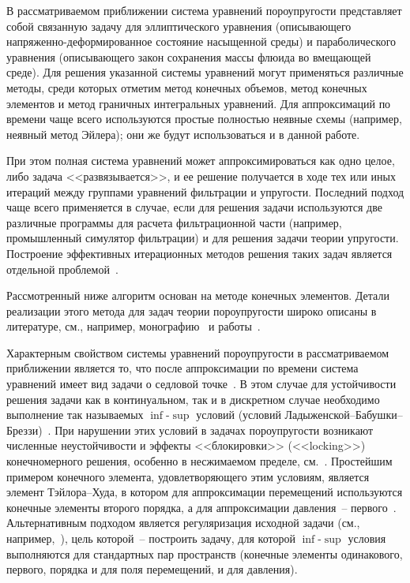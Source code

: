 %
%
В рассматриваемом приближении система уравнений пороупругости
представляет собой связанную задачу для эллиптического уравнения
(описывающего напряженно-деформированное состояние насыщенной среды) и
параболического уравнения (описывающего закон сохранения массы флюида
во вмещающей среде).
Для решения указанной системы уравнений могут применяться различные
методы, 
среди которых отметим метод конечных объемов, метод конечных элементов
и метод граничных интегральных уравнений. 
Для аппроксимаций по времени чаще всего используются простые полностью
неявные схемы (например, неявный метод Эйлера); они же будут использоваться
и в данной работе.

При этом полная система уравнений может аппроксимироваться как одно
целое, либо задача <<развязывается>>, и ее решение получается в
ходе тех или иных итераций между группами уравнений фильтрации и
упругости. Последний подход чаще всего применяется в случае, если
для решения задачи используются две различные программы для расчета
фильтрационной части (например, промышленный симулятор
фильтрации) и для решения задачи теории упругости. Построение
эффективных итерационных методов решения таких задач является
отдельной проблемой~\cite{kim2009, kim2010}.

Рассмотренный ниже алгоритм 
основан на методе конечных элементов. Детали реализации 
этого метода для задач теории пороупругости широко описаны в
литературе, см., например, монографию~\cite{lewis1998} и 
работы~\cite{noorishad1982, philips2005,
zheng2003}.

Характерным свойством системы уравнений пороупругости в
рассматриваемом приближении является то, что после аппроксимации по
времени система уравнений имеет вид задачи о седловой точке~\cite{brezzi1991}.
В этом случае для устойчивости решения задачи
как в континуальном, так и в дискретном случае необходимо выполнение
так называемых $\inf$-$\sup$ условий (условий
Ладыженской--Бабушки--Бреззи)~\cite{brezzi1991}. При нарушении
этих условий в задачах пороупругости возникают численные
неустойчивости и эффекты <<блокировки>> (<<locking>>) конечномерного
решения, особенно в несжимаемом пределе, см.~\cite{philips2009,
  preisig2011, haga2012, vermeer1981}.  Простейшим примером конечного
элемента, удовлетворяющего этим условиям, является элемент
Тэйлора--Худа, в котором для аппроксимации перемещений используются
конечные элементы второго порядка, а для аппроксимации давления~--
первого~\cite{ern2009, murad1996,
  showalter2000}. Альтернативным подходом является регуляризация
исходной задачи (см., например,~\cite{white2008,commend2004, wan2002,
  xia2009}), цель которой~-- построить задачу, для которой
$\inf$-$\sup$ условия выполняются для стандартных пар пространств
(конечные элементы одинакового, первого, порядка и для поля
перемещений, и для давления).

